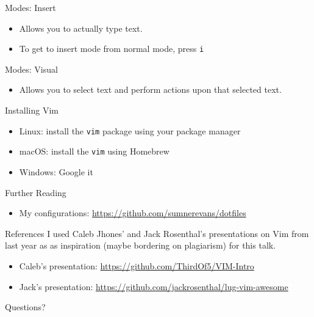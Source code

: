 \documentclass{lug}
\begin{document}
\begin{frame}{Modes: Insert}
    \begin{itemize}
        \item Allows you to actually type text.
        \item To get to insert mode from normal mode, press \texttt{i}
    \end{itemize}
\end{frame}

\begin{frame}{Modes: Visual}
    \begin{itemize}
        \item Allows you to select text and perform actions upon that selected
            text.
    \end{itemize}
\end{frame}

\begin{frame}{Installing Vim}
    \begin{itemize}
        \item Linux: install the \texttt{vim} package using your package manager
        \item macOS: install the \texttt{vim} using Homebrew
        \item Windows: Google it
    \end{itemize}
\end{frame}

\begin{frame}{Further Reading}
    \begin{itemize}
        \item My configurations: \url{https://github.com/sumnerevans/dotfiles}
    \end{itemize}
\end{frame}

\begin{frame}{References}
    I used Caleb Jhones' and Jack Rosenthal's presentations on Vim from last
    year as as inspiration (maybe bordering on plagiarism) for this talk.
    \begin{itemize}
        \item Caleb's presentation: \url{https://github.com/ThirdOf5/VIM-Intro}
        \item Jack's presentation: \url{https://github.com/jackrosenthal/lug-vim-awesome}
    \end{itemize}
\end{frame}

\begin{frame}[standout]
    \Huge
    Questions?
\end{frame}
\end{document}
